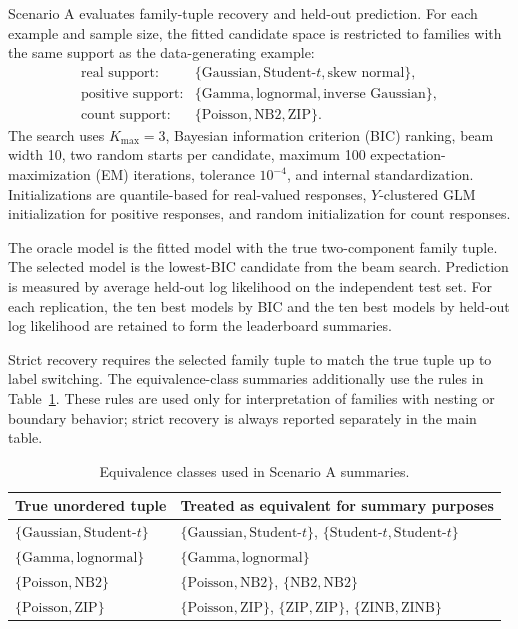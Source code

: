 \documentclass{article}
\begin{document}
Scenario A evaluates family-tuple recovery and held-out prediction.  For each
example and sample size, the fitted candidate space is restricted to families
with the same support as the data-generating example:
\[
\begin{array}{ll}
\text{real support:} & \{\text{Gaussian},\text{Student-}t,\text{skew normal}\},\\
\text{positive support:} & \{\text{Gamma},\text{lognormal},\text{inverse Gaussian}\},\\
\text{count support:} & \{\text{Poisson},\text{NB2},\text{ZIP}\}.
\end{array}
\]
The search uses \(K_{\max}=3\), Bayesian information criterion (BIC) ranking,
beam width 10, two random starts per candidate, maximum 100
expectation-maximization (EM) iterations, tolerance \(10^{-4}\), and internal
standardization.  Initializations are quantile-based for real-valued responses,
\(Y\)-clustered GLM initialization for positive responses, and random
initialization for count responses.

The oracle model is the fitted model with the true two-component family tuple.
The selected model is the lowest-BIC candidate from the beam search.  Prediction
is measured by average held-out log likelihood on the independent test set.
For each replication, the ten best models by BIC and the ten best models by
held-out log likelihood are retained to form the leaderboard summaries.

Strict recovery requires the selected family tuple to match the true tuple up to
label switching.  The equivalence-class summaries additionally use the rules in
Table~\ref{tab:supp_equiv}.  These rules are used only for interpretation of
families with nesting or boundary behavior; strict recovery is always reported
separately in the main table.

\begin{table}[htbp]
\centering
\caption{Equivalence classes used in Scenario A summaries.}
\label{tab:supp_equiv}
\begin{tabular}{ll}
\toprule
True unordered tuple & Treated as equivalent for summary purposes \\
\midrule
\(\{\text{Gaussian},\text{Student-}t\}\) &
\(\{\text{Gaussian},\text{Student-}t\}\), \(\{\text{Student-}t,\text{Student-}t\}\) \\
\(\{\text{Gamma},\text{lognormal}\}\) &
\(\{\text{Gamma},\text{lognormal}\}\) \\
\(\{\text{Poisson},\text{NB2}\}\) &
\(\{\text{Poisson},\text{NB2}\}\), \(\{\text{NB2},\text{NB2}\}\) \\
\(\{\text{Poisson},\text{ZIP}\}\) &
\(\{\text{Poisson},\text{ZIP}\}\), \(\{\text{ZIP},\text{ZIP}\}\), \(\{\text{ZINB},\text{ZINB}\}\) \\
\bottomrule
\end{tabular}
\end{table}
\end{document}

